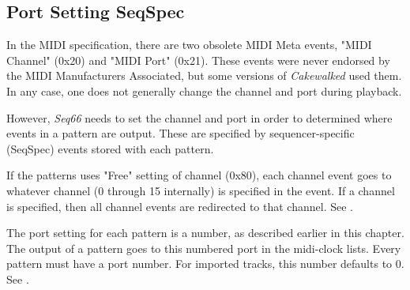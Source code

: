 \subsection{Port Setting SeqSpec}
\label{subsec:port_seqspec}

   In the MIDI specification, there are two obsolete MIDI Meta events,
   "MIDI Channel" (0x20) and "MIDI Port" (0x21).
   These events were never endorsed by the MIDI Manufacturers Associated,
   but some versions of \textsl{Cakewalked} used them.
   In any case, one does not generally change the channel and port during
   playback.

   However, \textsl{Seq66} needs to set the channel and port in order to
   determined where events in a pattern are output.
   These are specified by sequencer-specific (SeqSpec) events stored with
   each pattern.

   If the patterns uses "Free" setting of channel (0x80), each channel event
   goes to whatever channel (0 through 15 internally) is specified in the event.
   If a channel is specified, then all channel events are redirected to that
   channel.
   See .

   The port setting for each pattern is a number, as described earlier in
   this chapter.
   The output of a pattern goes to this numbered port in the midi-clock
   lists.
   Every pattern must have a port number.
   For imported tracks, this number defaults to 0.
   See .

